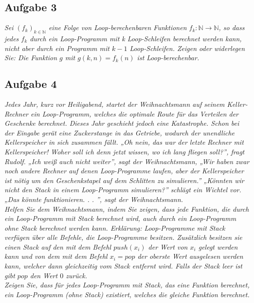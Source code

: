 \documentclass[a4paper]{article}
\begin{document}
\subsection{Aufgabe 3}
\textit{Sei $(f_k)_{k\in\mathbb{N}}$ eine Folge von Loop-berechenbaren Funktionen $f_k:\mathbb{N}\rightarrow\mathbb{N}$, so dass jedes $f_k$ durch ein Loop-Programm mit k Loop-Schleifen berechnet werden kann, nicht aber durch ein Programm mit $k-1$ Loop-Schleifen. Zeigen oder widerlegen Sie: Die Funktion $g$ mit $g(k, n) = f_k(n)$ ist Loop-berechenbar.}

\subsection{Aufgabe 4}
\textit{Jedes Jahr, kurz vor Heiligabend, startet der Weihnachtsmann auf seinem Keller-Rechner ein Loop-Programm, welches die optimale Route für das Verteilen der Geschenke berechnet. Dieses Jahr geschieht jedoch eine Katastrophe. Schon bei der Eingabe gerät eine Zuckerstange in das Getriebe, wodurch der unendliche Kellerspeicher in sich zusammen fällt. „Oh nein, das war der letzte Rechner mit Kellerspeicher! Woher soll ich denn jetzt wissen, wo ich lang fliegen soll?”, fragt Rudolf. „Ich weiß auch nicht weiter”, sagt der Weihnachtsmann, „Wir haben zwar noch andere Rechner auf denen Loop-Programme laufen, aber der Kellerspeicher ist nötig um den Geschenkstapel auf dem Schlitten zu simulieren.” „Könnten wir nicht den Stack in einem Loop-Programm simulieren?” schlägt ein Wichtel vor. „Das könnte funktionieren. . . ”, sagt der Weihnachtsmann.\\
    Helfen Sie dem Weihnachtsmann, indem Sie zeigen, dass jede Funktion, die durch ein Loop-Programm mit Stack berechnet wird, auch durch ein Loop-Programm ohne Stack berechnet werden kann. Erklärung: Loop-Programme mit Stack verfügen über alle Befehle, die Loop-Programme besitzen. Zusätzlich besitzen sie einen Stack auf den mit dem Befehl $push(x_i)$ der Wert von $x_i$ gelegt werden kann und von dem mit dem Befehl $x_i = pop$ der oberste Wert ausgelesen werden kann, welcher dann gleichzeitig vom Stack entfernt wird. Falls der Stack leer ist gibt $pop$ den Wert $0$ zurück.\\
    Zeigen Sie, dass für jedes Loop-Programm mit Stack, das eine Funktion berechnet, ein Loop-Programm (ohne Stack) existiert, welches die gleiche Funktion berechnet.}

\end{document}
